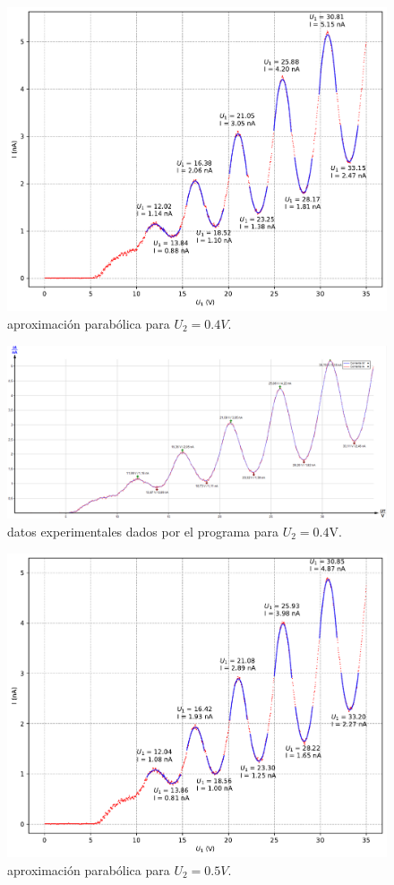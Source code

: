 \documentclass[12pt,a4paper]{article}
\numberwithin{equation}{section}
\numberwithin{figure}{section}
\begin{document}
\begin{figure}[h!]  \centering
\includegraphics[scale=0.70]{Parabola-1.pdf}
\caption{aproximación parabólica para $U_2=0.4V$.}
\label{Fig:2.1}
\end{figure}


\begin{figure}[h!]  \centering
\includegraphics[scale=0.40]{0_4-1.png}
\caption{datos experimentales dados por el programa para $U_2=0.4$V.}
\label{Fig:3.11}
\end{figure}
\newpage
\begin{figure}[h!] \centering
\includegraphics[scale=0.7]{Parabola-2.pdf}
\caption{aproximación parabólica para $U_2=0.5V$.}
\label{Fig:2.2}
\end{figure}
\end{document}
